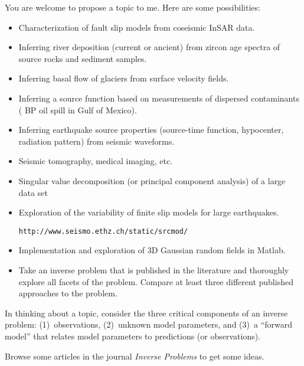 \documentclass[11pt,titlepage,fleqn]{article}
\begin{document}
You are welcome to propose a topic to me. Here are some possibilities:
%
\begin{itemize}
\item Characterization of fault slip models from coseismic InSAR data.


\item Inferring river deposition (current or ancient) from zircon age spectra of source rocks and sediment samples.

\item Inferring basal flow of glaciers from surface velocity fields.


\item Inferring a source function based on measurements of dispersed contaminants ( BP oil spill in Gulf of Mexico).

\item Inferring earthquake source properties (source-time function, hypocenter, radiation pattern) from seismic waveforms.

\item Seismic tomography, medical imaging, etc.

\item Singular value decomposition (or principal component analysis) of a large data set

\item Exploration of the variability of finite slip models for large earthquakes.

\verb+http://www.seismo.ethz.ch/static/srcmod/+

\item Implementation and exploration of 3D Gaussian random fields in Matlab.



\item Take an inverse problem that is published in the literature and thoroughly explore all facets of the problem. Compare at least three different published approaches to the problem.

\end{itemize}
%
In thinking about a topic, consider the three critical components of an inverse problem: (1)~observations, (2)~unknown model parameters, and (3)~a ``forward model'' that relates model parameters to predictions (or observations).

Browse some articles in the journal {\em Inverse Problems} to get some ideas.





\end{document}
